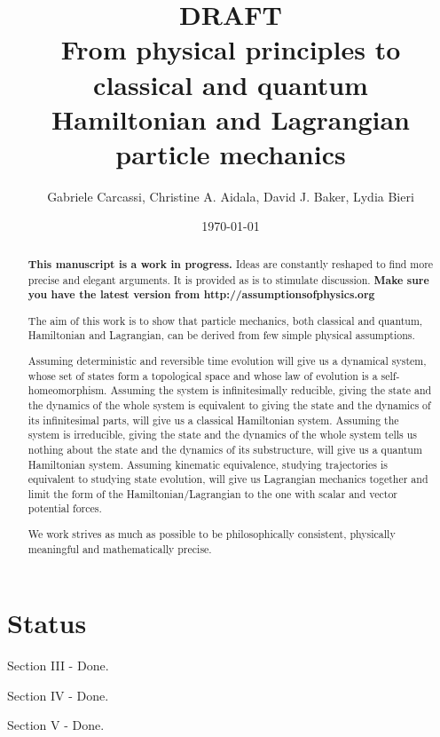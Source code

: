 \documentclass[aps,pra,10pt,twocolumn,floatfix,nofootinbib]{revtex4-1}
\numberwithin{equation}{section}
\theoremstyle{definition}
\begin{document}
\title{DRAFT \\ From physical principles to classical and quantum \\ Hamiltonian and Lagrangian particle mechanics}
\author{Gabriele Carcassi, Christine A. Aidala, David J. Baker, Lydia Bieri}
\date{\today}

\begin{abstract}
\textbf{This manuscript is a work in progress.} Ideas are constantly reshaped to find more precise and elegant arguments. It is provided as is to stimulate discussion.  \textbf{Make sure you have the latest version from http://assumptionsofphysics.org}

The aim of this work is to show that particle mechanics, both classical and quantum, Hamiltonian and Lagrangian, can be derived from few simple physical assumptions.

Assuming deterministic and reversible time evolution will give us a dynamical system, whose set of states form a topological space and whose law of evolution is a self-homeomorphism. Assuming the system is infinitesimally reducible, giving the state and the dynamics of the whole system is equivalent to giving the state and the dynamics of its infinitesimal parts, will give us a classical Hamiltonian system. Assuming the system is irreducible, giving the state and the dynamics of the whole system tells us nothing about the state and the dynamics of its substructure, will give us a quantum Hamiltonian system. Assuming kinematic equivalence, studying trajectories is equivalent to studying state evolution, will give us Lagrangian mechanics together and limit the form of the Hamiltonian/Lagrangian to the one with scalar and vector potential forces.

We work strives as much as possible to be philosophically consistent, physically meaningful and mathematically precise.
\end{abstract}
\maketitle

\section{Status}

Section III - Done.

Section IV - Done.

Section V - Done.
\end{document}
